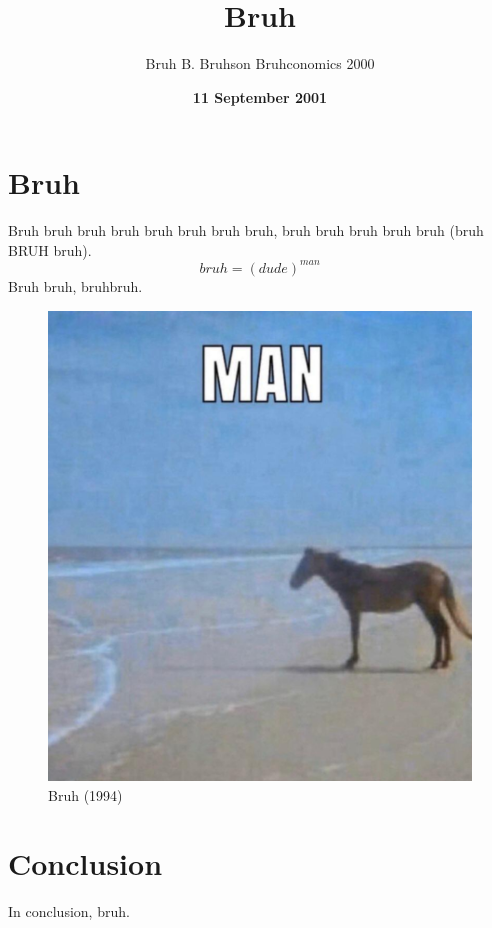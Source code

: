 \documentclass[12pt]{article}
\title{Bruh}
\author{Bruh B. Bruhson \; Bruhconomics 2000}
\date{\textbf{11 September 2001}}
\numberwithin{equation}{section}
\numberwithin{figure}{section}
\numberwithin{table}{section}
\begin{document}
    \maketitle
    \section{Bruh}
    Bruh bruh bruh bruh bruh bruh bruh bruh, bruh bruh bruh bruh bruh (bruh BRUH bruh).
    \begin{equation}
        bruh=(dude)^{man}
    \end{equation}
    Bruh bruh, bruhbruh.

    \begin{figure}[H]
        \begin{center}
            \includegraphics[width=.45\textwidth]{man.png}
            \caption{Bruh (1994)}
            \label{fig:bruh}
        \end{center}
    \end{figure}
    
    \section{Conclusion}\label{sec:Conclusion}
    In conclusion, bruh.
\end{document}

